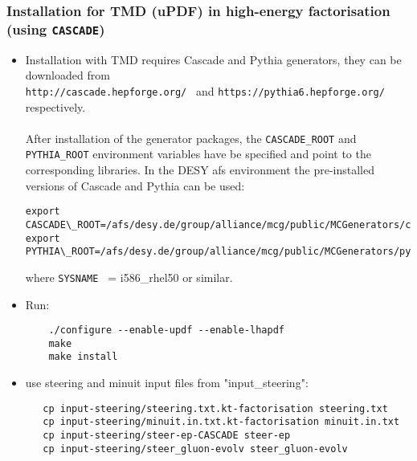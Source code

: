 \subsubsection{Installation for TMD (uPDF) in high-energy factorisation (using  {\tt CASCADE})}

\begin{itemize}

\item Installation with TMD requires Cascade and Pythia generators, 
they can be downloaded from\\
{\tt http://cascade.hepforge.org/ } and 
{\tt https://pythia6.hepforge.org/ } respectively. \\
        \\
After installation of the generator packages, the {\tt CASCADE\_ROOT}  and {\tt PYTHIA\_ROOT} 
environment variables have be specified and point to the corresponding libraries. 
In the DESY afs environment the pre-installed versions of Cascade and Pythia can be used:  
%
{\footnotesize\begin{verbatim}
export CASCADE\_ROOT=/afs/desy.de/group/alliance/mcg/public/MCGenerators/cascade/2.2.04/\$SYSNAME 
export PYTHIA\_ROOT=/afs/desy.de/group/alliance/mcg/public/MCGenerators/pythia6/425/\$SYSNAME}
\end{verbatim} }
\normalsize
where {\tt SYSNAME } = i586\_rhel50 or similar.

\item Run:
\begin{verbatim}
    ./configure --enable-updf --enable-lhapdf
    make 
    make install
\end{verbatim}


\item use steering and minuit input files from "input\_steering": 

   \begin{verbatim} 
   cp input-steering/steering.txt.kt-factorisation steering.txt 
   cp input-steering/minuit.in.txt.kt-factorisation minuit.in.txt 
   cp input-steering/steer-ep-CASCADE steer-ep 
   cp input-steering/steer_gluon-evolv steer_gluon-evolv
    \end{verbatim}


\end{itemize}

